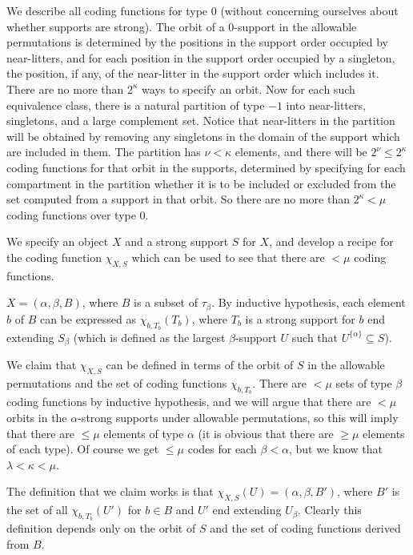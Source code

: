 We describe all coding functions for type 0 (without concerning ourselves about whether supports are strong).  The orbit of a 0-support in the allowable permutations is determined by the positions in the support order occupied by near-litters, and for each position in the support order occupied by a singleton, the position, if any, of the near-litter in the support order which includes it.  There are no more than $2^\kappa$ ways to specify an orbit.  Now for each such equivalence class, there is a natural partition of type $-1$ into near-litters, singletons, and a large complement set.  Notice that near-litters in the partition will be obtained by removing any singletons in the domain of the support which are included in them.  The partition has $\nu<\kappa$ elements, and there will be $2^\nu\leq 2^\kappa$ coding functions for that orbit in the supports, determined by specifying for each compartment in the partition whether it is to be included or excluded from the set computed from a support in that orbit.  So there are no more than $2^\kappa<\mu$ coding functions over type 0.

We specify an object $X$ and a strong support $S$ for $X$, and develop a recipe for the coding function $\chi_{X,S}$ which can be used to see that there are $<\mu$ coding functions.

$X = (\alpha,\beta,B)$, where $B$ is a subset of $\tau_\beta$.  By inductive hypothesis, each element $b$ of $B$ can be expressed as $\chi_{b,T_b}(T_b)$, where $T_b$ is a strong support for $b$ end extending $S_\beta$ (which is defined as the largest $\beta$-support $U$ such that $U^{\{\alpha\}} \subseteq S$).

We claim that $\chi_{X,S}$ can be defined in terms of the orbit of $S$ in the allowable permutations and the set of coding functions $\chi_{b,T_b}$.  There are $<\mu$ sets of type $\beta$ coding functions by inductive hypothesis, and we will argue that there are $<\mu$ orbits in the $\alpha$-strong supports under allowable permutations, so this will imply that there are $\leq \mu$ elements of type $\alpha$ (it is obvious that there are $\geq \mu$ elements of each type).
Of course we get $\leq \mu$ codes for each $\beta<\alpha$, but we know that $\lambda<\kappa<\mu$.

The definition that we claim works is that $\chi_{X,S}(U) = (\alpha,\beta,B')$, where $B'$ is the set of all $\chi_{b,T_b}(U')$ for $b \in B$ and $U'$ end extending $U_\beta$.  Clearly this definition depends only on the orbit of $S$ and the set of coding functions derived from $B$.

